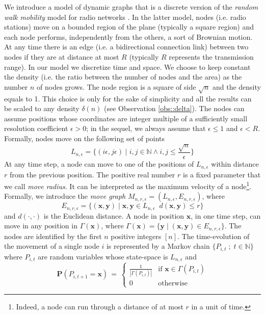 \documentclass[10pt,a4paper]{article}
\newcommand{\Prob}[1]{\mathbf{P} \left( #1 \right)}
\begin{document}
We introduce a model of dynamic graphs that is a discrete version of the \emph{random walk mobility} model for radio networks \cite{CBD02}. In the latter model, nodes (i.e. radio stations) move on a bounded region of the plane (typically a square region) and each node performs, independently from the others, a sort of Brownian motion. At any time there is an edge (i.e. a bidirectional connection link) between two nodes if they are at distance at most $R$ (typically $R$ represents the transmission range). In our model we discretize time and space. We choose to keep constant the density (i.e. the ratio between the number of nodes and the area) as the number $n$ of nodes grows. The node region is a square of side $\sqrt{n}$ and the density equals to 1. This choice is only for the sake of
simplicity and all the results can be scaled to any density $\delta(n)$ (see Observation \ref{obs::delta}). 
The nodes can assume positions whose coordinates are integer multiple of a sufficiently small resolution coefficient $\epsilon >0$; in the sequel, we always assume that $\epsilon \leqslant  1$  and $\epsilon < R$.
Formally, nodes move on the following set of points
$$
L_{n,\epsilon} = \{ (i\epsilon, j\epsilon)\;|\; i,j\in \mathbb{N} \wedge i, j \leqslant \frac{\sqrt{n}}{\epsilon}\}
$$
At any time step, a node can move to one of the positions of $L_{n,\epsilon}$ within distance $r$ from the previous position. The positive real number $r$ is a fixed parameter that we call \emph{move radius}. It can be interpreted as the maximum velocity of a node\footnote{Indeed, a node can run through a distance of at most $r$ in a unit of time.}. Formally, we introduce the \emph{move graph} $M_{n, r, \epsilon} = (L_{n,\epsilon}, E_{n,r,\epsilon})$, where
$$
E_{n,r, \epsilon} = \{ (\mathbf{x}, \mathbf{y}) \;|\; \mathbf{x}, \mathbf{y}\in L_{n,\epsilon}\;\;
d(\mathbf{x}, \mathbf{y}) \leqslant r \}
$$
and $d(\cdot, \cdot)$ is the Euclidean distance. A node in position $\mathbf{x}$, in one time step, can move in any position in $\Gamma(\mathbf{x})$, where $\Gamma(\mathbf{x}) = \{ \mathbf{y}\; |\; (\mathbf{x}, \mathbf{y})\in E_{n,r,\epsilon}\}$. The nodes are identified by the first $n$ positive integers $[n]$. The time-evolution of the movement of a single node $i$ is represented by a Markov chain $\{P_{i,t}\; ;\; t\in\mathbb{N}\}$ where $P_{i,t}$ are random variables whose state-space is $L_{n,\epsilon}$ and
$$
\Prob{P_{i,t+1} = \mathbf{x} } \, = \,
\left\{
\begin{array}{ll}
\frac{1}{|\Gamma(P_{i, t})|} & \mbox{if $\mathbf{x} \in \Gamma(P_{i, t})$}\\
0 & \mbox{otherwise}
\end{array}
\right.
$$
\end{document}
